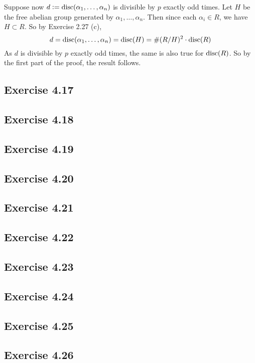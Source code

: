 \documentclass[../Marcus.tex]{subfiles}
\begin{document}
Suppose now $d:=\operatorname{disc}(\alpha_1,\ldots,\alpha_n)$ is divisible by $p$ exactly odd times. Let $H$ be the free abelian group generated by $\alpha_1,\ldots,\alpha_n$. Then since each $\alpha_i \in R$, we have $H \subset R$. So by Exercise 2.27 (c),
$$
d = \operatorname{disc}(\alpha_1,\ldots,\alpha_n) = \operatorname{disc}(H) = \#(R/H)^2 \cdot \operatorname{disc}(R)
$$
As $d$ is divisible by $p$ exactly odd times, the same is also true for $\operatorname{disc}(R)$. So by the first part of the proof, the result follows.

\subsection*{Exercise 4.17}

\subsection*{Exercise 4.18}

\subsection*{Exercise 4.19}

\subsection*{Exercise 4.20}

\subsection*{Exercise 4.21}

\subsection*{Exercise 4.22}

\subsection*{Exercise 4.23}

\subsection*{Exercise 4.24}

\subsection*{Exercise 4.25}

\subsection*{Exercise 4.26}
\end{document}
